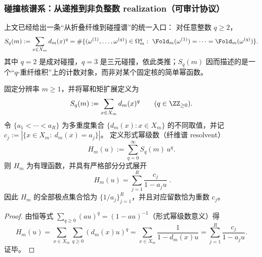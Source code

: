 \subsubsection{碰撞核谱系：从递推到非负整数 realization（可审计协议）}\label{subsubsec:pom-collision-kernel-family}
上文已经给出一条“从折叠纤维到碰撞谱”的统一入口：
对任意整数 \(q\ge 2\)，
\[
S_q(m):=\sum_{x\in X_m}d_m(x)^q
=\#\{(\omega^{(1)},\dots,\omega^{(q)})\in\Omega_m^q:\ \Fold_m(\omega^{(1)})=\cdots=\Fold_m(\omega^{(q)})\}.
\]
其中 \(q=2\) 是成对碰撞，\(q=3\) 是三元碰撞，依此类推；\(S_q(m)\) 因而描述的是一个“\(q\)-重纤维积”上的计数对象，而非对某个固定核的简单幂函数。
\par


\begin{theorem}\label{thm:pom-fiber-spectrum-resolvent-rational}
固定分辨率 \(m\ge 1\)，并将幂和矩扩展定义为
\[
S_q(m):=\sum_{x\in X_m} d_m(x)^q\qquad(q\in\ZZ_{\ge 0}).
\]
令 \(\{a_1<\cdots<a_R\}\) 为多重度集合 \(\{d_m(x):x\in X_m\}\) 的不同取值，并记
\(
c_j:=|\{x\in X_m:\ d_m(x)=a_j\}|
\)。
定义形式幂级数（纤维谱 resolvent）
\[
H_m(u):=\sum_{q=0}^{\infty} S_q(m)\,u^q.
\]
则 \(H_m\) 为有理函数，并具有严格部分分式展开
\[
\boxed{\;
H_m(u)=\sum_{j=1}^{R}\frac{c_j}{1-a_j u}\; }.
\]
因此 \(H_m\) 的全部极点集合恰为 \(\{1/a_j\}_{j=1}^{R}\)，并且对应留数恰为重数 \(c_j\)。
\end{theorem}
\begin{proof}
由恒等式 \(\sum_{q\ge 0}(au)^q=(1-au)^{-1}\)（形式幂级数意义）得
\[
H_m(u)=\sum_{x\in X_m}\sum_{q\ge 0}(d_m(x)u)^q
=\sum_{x\in X_m}\frac{1}{1-d_m(x)u}
=\sum_{j=1}^{R}\frac{c_j}{1-a_j u}.
\]
证毕。
\end{proof}

